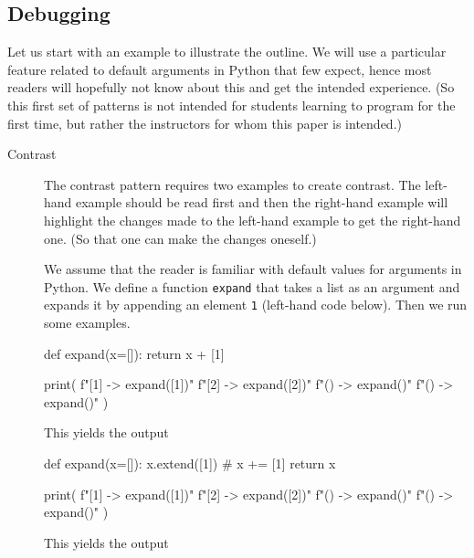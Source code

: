 \mode*

\subsection{Debugging}

Let us start with an example to illustrate the outline.
We will use a particular feature related to default arguments in Python that 
few expect, hence most readers will hopefully not know about this and get the 
intended experience.
(So this first set of patterns is not intended for students learning to program 
for the first time, but rather the instructors for whom this paper is 
intended.)

\begin{description}
  \item[Contrast] The contrast pattern requires two examples to create 
    contrast.
    The left-hand example should be read first and then the right-hand 
    example will highlight the changes made to the left-hand example to get 
    the right-hand one.
    (So that one can make the changes oneself.)

    We assume that the reader is familiar with default values for arguments in 
    Python.
    We define a function \texttt{expand} that takes a list as an 
    argument and expands it by appending an element \texttt{1} 
    (left-hand code below).
    Then we run some examples.

    \begin{minipage}[t]{0.45\columnwidth}
      \begin{pyblock}[default1]
def expand(x=[]):
  return x + [1]


print(
  f"[1] -> {expand([1])}\n"
  f"[2] -> {expand([2])}\n"
  f"()  -> {expand()}\n"
  f"()  -> {expand()}\n"
)
      \end{pyblock}
      This yields the output
      \printpythontex[verbatim]
    \end{minipage}
    \hfill
    \begin{minipage}[t]{0.45\columnwidth}
      \begin{pyblock}[default2][highlightlines={2-3}]
def expand(x=[]):
  x.extend([1]) # x += [1]
  return x

print(
  f"[1] -> {expand([1])}\n"
  f"[2] -> {expand([2])}\n"
  f"()  -> {expand()}\n"
  f"()  -> {expand()}\n"
)
      \end{pyblock}
      This yields the output
      \printpythontex[verbatim][highlightlines={4}]
    \end{minipage}


\end{description}

